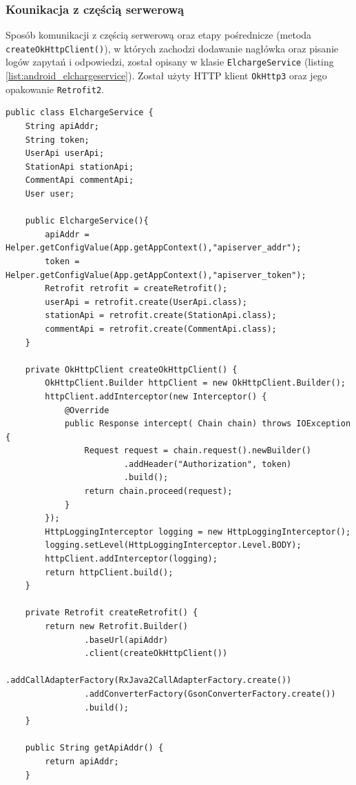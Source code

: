 \subsubsection{Kounikacja z częścią serwerową}
Sposób komunikacji z częścią serwerową oraz etapy pośrednicze (metoda \texttt{createOkHttpClient()}), w których zachodzi dodawanie nagłówka oraz pisanie logów zapytań i odpowiedzi, został opisany w klasie \texttt{ElchargeService} (listing \ref{list:android_elchargeservice}). Został użyty HTTP klient \texttt{OkHttp3} oraz jego opakowanie \texttt{Retrofit2}.
\begin{lstlisting}[label=list:android_elchargeservice,caption=obsługa komunikacji z częścią serwerową,basicstyle=\tiny\ttfamily]
    public class ElchargeService {
    String apiAddr;
    String token;
    UserApi userApi;
    StationApi stationApi;
    CommentApi commentApi;
    User user;

    public ElchargeService(){
        apiAddr = Helper.getConfigValue(App.getAppContext(),"apiserver_addr");
        token = Helper.getConfigValue(App.getAppContext(),"apiserver_token");
        Retrofit retrofit = createRetrofit();
        userApi = retrofit.create(UserApi.class);
        stationApi = retrofit.create(StationApi.class);
        commentApi = retrofit.create(CommentApi.class);
    }

    private OkHttpClient createOkHttpClient() {
        OkHttpClient.Builder httpClient = new OkHttpClient.Builder();
        httpClient.addInterceptor(new Interceptor() {
            @Override
            public Response intercept( Chain chain) throws IOException {
                Request request = chain.request().newBuilder()
                        .addHeader("Authorization", token)
                        .build();
                return chain.proceed(request);
            }
        });
        HttpLoggingInterceptor logging = new HttpLoggingInterceptor();
        logging.setLevel(HttpLoggingInterceptor.Level.BODY);
        httpClient.addInterceptor(logging);
        return httpClient.build();
    }

    private Retrofit createRetrofit() {
        return new Retrofit.Builder()
                .baseUrl(apiAddr)
                .client(createOkHttpClient())
                .addCallAdapterFactory(RxJava2CallAdapterFactory.create())
                .addConverterFactory(GsonConverterFactory.create())
                .build();
    }

    public String getApiAddr() {
        return apiAddr;
    }


\end{lstlisting}
